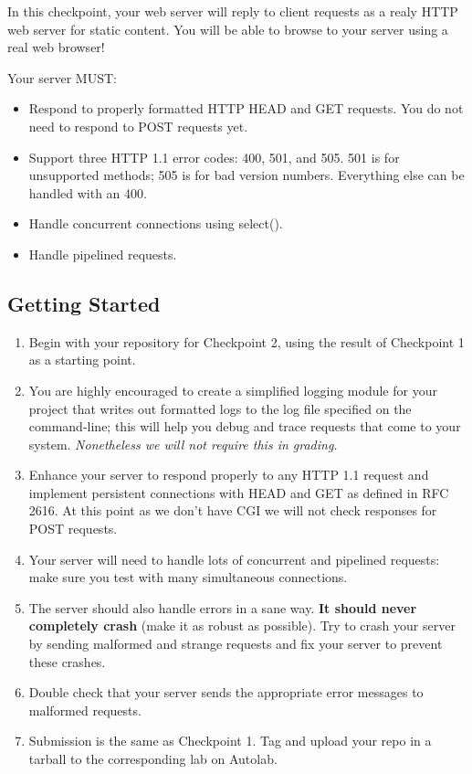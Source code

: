 In this checkpoint, your web server will reply to client requests as a realy HTTP web server for static content. You will be able to browse to your server using a real web browser!

\vspace{5pt}

\noindent Your server MUST:
\begin{itemize}
    \item Respond to properly formatted HTTP HEAD and GET requests. You do not need to respond to POST requests yet.
    \item Support three HTTP 1.1 error codes: 400, 501, and 505. 501 is for unsupported methods; 505 is for bad version numbers. Everything else can be handled with an 400.
    \item Handle concurrent connections using select().
    \item Handle pipelined requests.
\end{itemize}

\subsection{Getting Started}
\begin{enumerate}
\item Begin with your repository for Checkpoint 2, using the result of Checkpoint 1 as a starting point.
\item You are highly encouraged to create a simplified logging module for your project that writes out formatted logs to the log file specified on the command-line; this will help you debug and trace requests that come to your system. {\it Nonetheless we will not require this in grading.}
\item Enhance your server to respond properly to any HTTP 1.1 request and implement persistent connections with HEAD and GET as defined in RFC 2616. At this point as we don't have CGI we will not check responses for POST requests.
\item Your server will need to handle lots of concurrent and pipelined requests: make sure you test with many simultaneous connections.
\item The server should also handle errors in a sane way. {\bf It should never completely crash} (make it as robust as possible). Try to crash your server by sending malformed and strange requests and fix your server to prevent these crashes.
\item Double check that your server sends the appropriate error messages to malformed requests.
\item Submission is the same as Checkpoint 1. Tag and upload your repo in a tarball to the corresponding lab on Autolab.
\end{enumerate}


